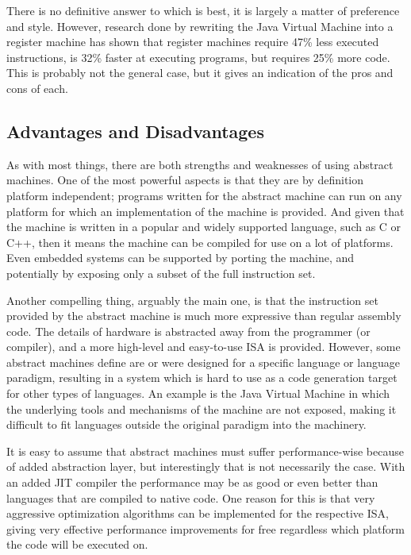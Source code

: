 There is no definitive answer to which is best, it is largely a matter of
preference and style. However, research done by rewriting the Java Virtual
Machine into a register machine has shown that register machines require 47\%
less executed instructions, is 32\% faster at executing programs, but requires
25\% more code\cite{shi05}. This is probably not the general case, but it gives
an indication of the pros and cons of each.

\subsection{Advantages and Disadvantages}

As with most things, there are both strengths and weaknesses of using abstract
machines. One of the most powerful aspects is that they are by definition
platform independent; programs written for the abstract machine can run on any
platform for which an implementation of the machine is provided. And given that
the machine is written in a popular and widely supported language, such as C or
C++, then it means the machine can be compiled for use on a lot of
platforms. Even embedded systems can be supported by porting the machine, and
potentially by exposing only a subset of the full instruction set.

Another compelling thing, arguably the main one, is that the instruction set
provided by the abstract machine is much more expressive than regular assembly
code. The details of hardware is abstracted away from the programmer (or
compiler), and a more high-level and easy-to-use ISA is provided. However, some
abstract machines define are or were designed for a specific language or
language paradigm, resulting in a system which is hard to use as a code
generation target for other types of languages. An example is the Java Virtual
Machine in which the underlying tools and mechanisms of the machine are not
exposed, making it difficult to fit languages outside the original paradigm into
the machinery.

It is easy to assume that abstract machines must suffer performance-wise because
of added abstraction layer, but interestingly that is not necessarily the
case. With an added JIT compiler the performance may be as good or even better
than languages that are compiled to native code\cite{mangione98, qwertie11}. One
reason for this is that very aggressive optimization algorithms can be
implemented for the respective ISA, giving very effective performance
improvements for free regardless which platform the code will be executed on.

